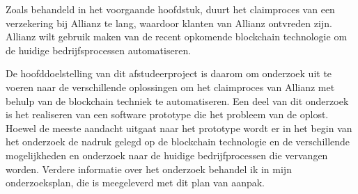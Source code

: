 Zoals behandeld in het voorgaande hoofdstuk, duurt het claimproces van een verzekering bij Allianz te lang, waardoor klanten van Allianz ontvreden zijn. Allianz wilt gebruik maken van de recent opkomende blockchain technologie om de huidige bedrijfsprocessen automatiseren.

De hoofddoelstelling van dit afstudeerproject is daarom om onderzoek uit te voeren naar de verschillende oplossingen om het claimproces van Allianz met behulp van de blockchain techniek te automatiseren. Een deel van dit onderzoek is het realiseren van een software prototype die het probleem van de oplost. Hoewel de meeste aandacht uitgaat naar het prototype wordt er in het begin van het onderzoek de nadruk gelegd op de blockchain technologie en de verschillende mogelijkheden en onderzoek naar de huidige bedrijfprocessen die vervangen worden. Verdere informatie over het onderzoek behandel ik in mijn onderzoeksplan, die is meegeleverd met dit plan van aanpak.
